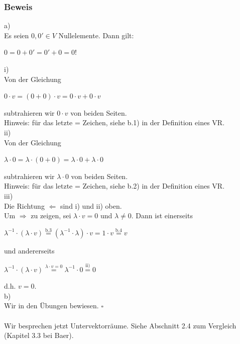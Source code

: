 \documentclass{article}
\begin{document}
\subsubsection*{Beweis}
a) \\
Es seien $0,0' \in V$ Nullelemente. Dann gilt: \\
\begin{center}
    $0 = 0 + 0' = 0' + 0 = 0!$ \\
\end{center}
i) \\
Von der Gleichung \\
\begin{center}
    $0 \cdot v = (0+0) \cdot v = 0 \cdot v + 0 \cdot v$ \\
\end{center}
subtrahieren wir $0 \cdot v$ von beiden Seiten. \\
Hinweis: für das letzte = Zeichen, siehe b.1) in der Definition eines VR. \\
ii) \\
Von der Gleichung \\
\begin{center}
    $\lambda \cdot 0 = \lambda \cdot (0+0) = \lambda \cdot 0 + \lambda \cdot 0$ \\
\end{center}
subtrahieren wir $\lambda \cdot 0$ von beiden Seiten. \\
Hinweis: für das letzte = Zeichen, siehe b.2) in der Definition eines VR. \\
iii) \\
Die Richtung $\Leftarrow$ sind i) und ii) oben. \\
Um $\Rightarrow$ zu zeigen, sei $\lambda \cdot v = 0$ und $\lambda \neq 0$. Dann ist einerseits \\
\begin{center}
    $\lambda^{-1} \cdot (\lambda \cdot v) \overset{\text{b.3}}{=} (\lambda^{-1} \cdot \lambda) \cdot v = 1 \cdot v \overset{\text{b.4}}{=} v$ \\
\end{center}
und andererseits \\
\begin{center}
    $\lambda^{-1} \cdot (\lambda \cdot v) \overset{\lambda \cdot v = 0}{=} \lambda^{-1} \cdot 0 \overset{\text{ii)}}{=} 0$ \\
\end{center}
d.h. $v = 0$. \\
b) \\
Wir in den Übungen bewiesen. $\square$ \\
\\
Wir besprechen jetzt Untervektorräume. Siehe Abschnitt 2.4 zum Vergleich (Kapitel 3.3 bei Baer). \\
\\
\end{document}
